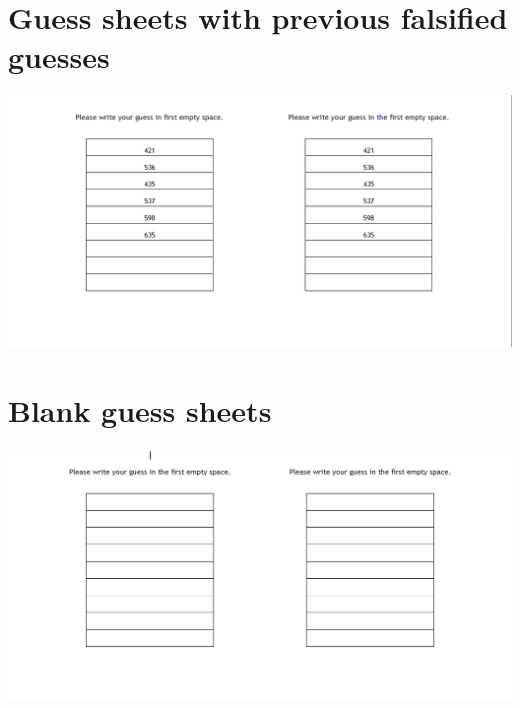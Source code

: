 \documentclass{report}
\begin{document}
\appendix
\appendixpage
\addappheadtotoc
\chapter{Guess sheets with previous falsified guesses}
\includegraphics[width=\textwidth]{psych1}
\chapter{Blank guess sheets}
\includegraphics[width=\textwidth]{psych2}
\end{document}
